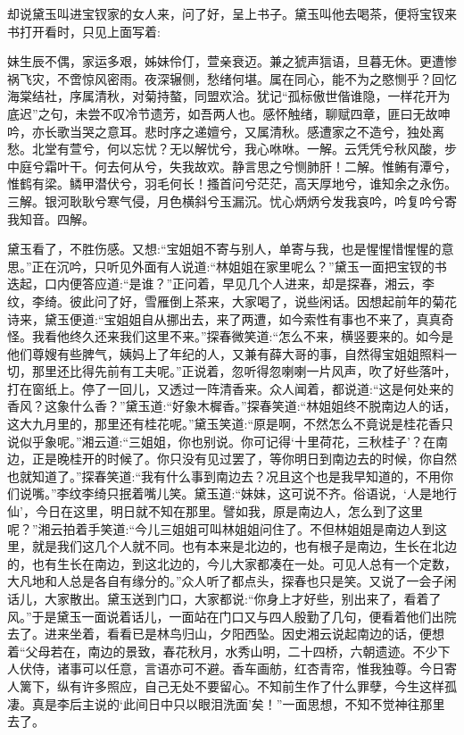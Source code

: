 


\begin{parag}
    却说黛玉叫进宝钗家的女人来，问了好，呈上书子。黛玉叫他去喝茶，便将宝钗来书打开看时，只见上面写着:
\end{parag}


\begin{qute2sp}
    妹生辰不偶，家运多艰，姊妹伶仃，萱亲衰迈。兼之猇声狺语，旦暮无休。更遭惨祸飞灾，不啻惊风密雨。夜深辗侧，愁绪何堪。属在同心，能不为之愍恻乎？回忆海棠结社，序属清秋，对菊持螯，同盟欢洽。犹记“孤标傲世偕谁隐，一样花开为底迟”之句，未尝不叹冷节遗芳，如吾两人也。感怀触绪，聊赋四章，匪曰无故呻吟，亦长歌当哭之意耳。悲时序之递嬗兮，又属清秋。感遭家之不造兮，独处离愁。北堂有萱兮，何以忘忧？无以解忧兮，我心咻咻。一解。云凭凭兮秋风酸，步中庭兮霜叶干。何去何从兮，失我故欢。静言思之兮恻肺肝！二解。惟鲔有潭兮，惟鹤有梁。鳞甲潜伏兮，羽毛何长！搔首问兮茫茫，高天厚地兮，谁知余之永伤。三解。银河耿耿兮寒气侵，月色横斜兮玉漏沉。忧心炳炳兮发我哀吟，吟复吟兮寄我知音。四解。
\end{qute2sp}


\begin{parag}
    黛玉看了，不胜伤感。又想:“宝姐姐不寄与别人，单寄与我，也是惺惺惜惺惺的意思。”正在沉吟，只听见外面有人说道:“林姐姐在家里呢么？”黛玉一面把宝钗的书迭起，口内便答应道:“是谁？”正问着，早见几个人进来，却是探春，湘云，李纹，李绮。彼此问了好，雪雁倒上茶来，大家喝了，说些闲话。因想起前年的菊花诗来，黛玉便道:“宝姐姐自从挪出去，来了两遭，如今索性有事也不来了，真真奇怪。我看他终久还来我们这里不来。”探春微笑道:“怎么不来，横竖要来的。如今是他们尊嫂有些脾气，姨妈上了年纪的人，又兼有薛大哥的事，自然得宝姐姐照料一切，那里还比得先前有工夫呢。”正说着，忽听得忽喇喇一片风声，吹了好些落叶，打在窗纸上。停了一回儿，又透过一阵清香来。众人闻着，都说道:“这是何处来的香风？这象什么香？”黛玉道:“好象木樨香。”探春笑道:“林姐姐终不脱南边人的话，这大九月里的，那里还有桂花呢。”黛玉笑道:“原是啊，不然怎么不竟说是桂花香只说似乎象呢。”湘云道:“三姐姐，你也别说。你可记得‘十里荷花，三秋桂子’？在南边，正是晚桂开的时候了。你只没有见过罢了，等你明日到南边去的时候，你自然也就知道了。”探春笑道:“我有什么事到南边去？况且这个也是我早知道的，不用你们说嘴。”李纹李绮只抿着嘴儿笑。黛玉道:“妹妹，这可说不齐。俗语说，‘人是地行仙’，今日在这里，明日就不知在那里。譬如我，原是南边人，怎么到了这里呢？”湘云拍着手笑道:“今儿三姐姐可叫林姐姐问住了。不但林姐姐是南边人到这里，就是我们这几个人就不同。也有本来是北边的，也有根子是南边，生长在北边的，也有生长在南边，到这北边的，今儿大家都凑在一处。可见人总有一个定数，大凡地和人总是各自有缘分的。”众人听了都点头，探春也只是笑。又说了一会子闲话儿，大家散出。黛玉送到门口，大家都说:“你身上才好些，别出来了，看着了风。”于是黛玉一面说着话儿，一面站在门口又与四人殷勤了几句，便看着他们出院去了。进来坐着，看看已是林鸟归山，夕阳西坠。因史湘云说起南边的话，便想着“父母若在，南边的景致，春花秋月，水秀山明，二十四桥，六朝遗迹。不少下人伏侍，诸事可以任意，言语亦可不避。香车画舫，红杏青帘，惟我独尊。今日寄人篱下，纵有许多照应，自己无处不要留心。不知前生作了什么罪孽，今生这样孤凄。真是李后主说的‘此间日中只以眼泪洗面’矣！”一面思想，不知不觉神往那里去了。
\end{parag}



